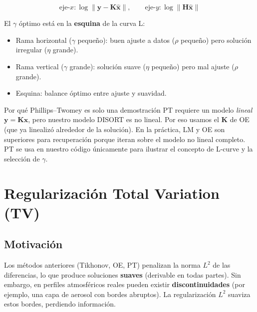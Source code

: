 \documentclass[a4paper,11pt]{article}
\begin{document}
\begin{equation}
    \text{eje-}x: \log\|\mathbf{y}-\mathbf{K}\hat{\mathbf{x}}\|, \qquad
    \text{eje-}y: \log\|\mathbf{H}\hat{\mathbf{x}}\|
\end{equation}

El $\gamma$ \'optimo est\'a en la \textbf{esquina} de la curva L:
\begin{itemize}
    \item Rama horizontal ($\gamma$ peque\~no): buen ajuste a datos
          ($\rho$ peque\~no) pero soluci\'on irregular ($\eta$ grande).
    \item Rama vertical ($\gamma$ grande): soluci\'on suave ($\eta$ peque\~no)
          pero mal ajuste ($\rho$ grande).
    \item Esquina: balance \'optimo entre ajuste y suavidad.
\end{itemize}

\begin{physics}{Por qu\'e Phillips--Twomey es solo una demostraci\'on}
PT requiere un modelo \emph{lineal} $\mathbf{y} = \mathbf{K}\mathbf{x}$,
pero nuestro modelo DISORT es no lineal.  Por eso usamos el $\mathbf{K}$ de
OE (que ya linealiz\'o alrededor de la soluci\'on).  En la pr\'actica, LM y
OE son superiores para recuperaci\'on porque iteran sobre el modelo no lineal
completo.  PT se usa en nuestro c\'odigo \'unicamente para ilustrar el
concepto de L-curve y la selecci\'on de $\gamma$.
\end{physics}


\section{Regularizaci\'on Total Variation (TV)}\label{sec:tv}

\subsection{Motivaci\'on}

Los m\'etodos anteriores (Tikhonov, OE, PT) penalizan la norma $L^2$ de las
diferencias, lo que produce soluciones \textbf{suaves} (derivable en todas
partes).  Sin embargo, en perfiles atmosf\'ericos reales pueden existir
\textbf{discontinuidades} (por ejemplo, una capa de aerosol con bordes
abruptos).  La regularizaci\'on $L^2$ suaviza estos bordes, perdiendo
informaci\'on.
\end{document}
